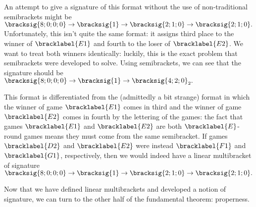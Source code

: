 {    

    An attempt to give a signature of this format without the use of non-traditional semibrackets might be $\bracksig{8;0;0;0} \to \bracksig{1} \to \bracksig{2;1;0} \to \bracksig{2;1;0}.$ Unfortunately, this isn't quite the same format: it assigns third place to the winner of $\bracklabel{E1}$ and fourth to the loser of $\bracklabel{E2}$. We want to treat both winners identically: luckily, this is the exact problem that semibrackets were developed to solve. Using semibrackets, we can see that the signature should be $\bracksig{8;0;0;0} \to \bracksig{1} \to \bracksig{4;2;0}_2.$


    This format is differentiated from the (admittedly a bit strange) format in which the winner of game $\bracklabel{E1}$ comes in third and the winner of game $\bracklabel{E2}$ comes in fourth by the lettering of the games: the fact that games $\bracklabel{E1}$ and $\bracklabel{E2}$ are both $\bracklabel{E}$-round games means they must come from the same semibracket. If games $\bracklabel{D2}$ and $\bracklabel{E2}$ were instead $\bracklabel{F1}$ and $\bracklabel{G1}$, respectively, then we would indeed have a linear multibracket of signature $\bracksig{8;0;0;0} \to \bracksig{1} \to \bracksig{2;1;0} \to \bracksig{2;1;0}.$

    Now that we have defined linear multibrackets and developed a notion of signature, we can turn to the other half of the fundamental theorem: properness.
}
